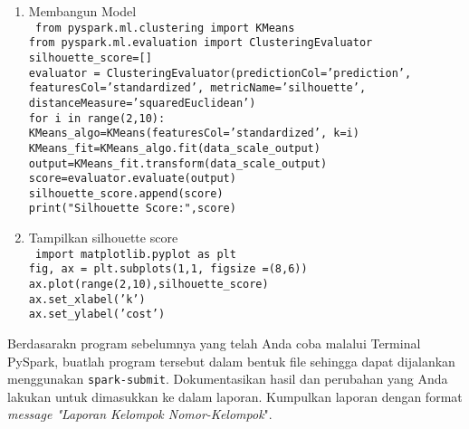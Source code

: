 \documentclass[a4paper]{tufte-handout}
\begin{document}
\begin{enumerate}
\item Membangun Model \\
{\tt
from pyspark.ml.clustering import KMeans \\
from pyspark.ml.evaluation import ClusteringEvaluator \\
silhouette\_score=[] \\
evaluator = ClusteringEvaluator(predictionCol='prediction', featuresCol='standardized', metricName='silhouette', distanceMeasure='squaredEuclidean') \\
for i in range(2,10): \\
    KMeans\_algo=KMeans(featuresCol='standardized', k=i) \\
    KMeans\_fit=KMeans\_algo.fit(data\_scale\_output) \\
    output=KMeans\_fit.transform(data\_scale\_output) \\
    score=evaluator.evaluate(output) \\
    silhouette\_score.append(score) \\
    print("Silhouette Score:",score) \\
}
\item Tampilkan silhouette score \\
{\tt
import matplotlib.pyplot as plt \\
fig, ax = plt.subplots(1,1, figsize =(8,6)) \\
ax.plot(range(2,10),silhouette\_score) \\
ax.set\_xlabel('k') \\
ax.set\_ylabel('cost') \\
}
\end{enumerate}

\hrulefill

\clearpage
{}


Berdasarakn program sebelumnya yang telah Anda coba malalui Terminal PySpark, buatlah program tersebut dalam bentuk file sehingga dapat dijalankan menggunakan {\tt spark-submit}. Dokumentasikan hasil dan perubahan yang Anda lakukan untuk dimasukkan ke dalam laporan. Kumpulkan laporan dengan format \textit{message "Laporan Kelompok Nomor-Kelompok}".

\hrulefill

\clearpage
{}
\end{document}
